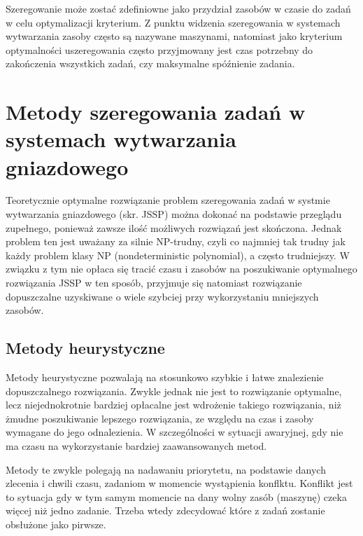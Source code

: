 \documentclass[twoside]{kInzynierka}
\begin{document}
Szeregowanie może zostać zdefiniowne jako przydział zasobów w czasie do zadań w celu optymalizacji kryterium. Z punktu widzenia szeregowania w systemach wytwarzania zasoby często są nazywane maszynami, natomiast jako kryterium optymalności uszeregowania często przyjmowany jest czas potrzebny do zakończenia wszystkich zadań, czy maksymalne spóźnienie zadania. \cite{antColony}  

\section        [Metody szeregowania zadań \ldots]
		        {Metody szeregowania zadań \newline w systemach wytwarzania gniazdowego}

Teoretycznie optymalne rozwiązanie problem szeregowania zadań w systmie wytwarzania gniazdowego (skr. JSSP) można dokonać na podstawie przeglądu zupełnego, ponieważ zawsze ilość możliwych rozwiązań jest skończona. Jednak problem ten jest uważany za silnie NP-trudny, czyli co najmniej tak trudny jak każdy problem klasy NP (nondeterministic polynomial), a często trudniejszy. W związku z tym nie opłaca się tracić czasu i zasobów na poszukiwanie optymalnego rozwiązania JSSP w ten sposób, przyjmuje się natomiast 
rozwiązanie dopuszczalne uzyskiwane o wiele szybciej przy wykorzystaniu mniejszych zasobów.

\subsection     {Metody heurystyczne}
Metody heurystyczne pozwalają na stosunkowo szybkie i łatwe znalezienie dopuszczalnego rozwiązania. Zwykle jednak nie jest to rozwiązanie optymalne, lecz niejednokrotnie bardziej opłacalne jest wdrożenie takiego rozwiązania, niż żmudne poszukiwanie lepszego rozwiązania, ze względu na czas i zasoby wymagane do jego odnalezienia. W szczególności w sytuacji awaryjnej, gdy nie ma czasu na wykorzystanie bardziej zaawansowanych metod. 

Metody te zwykle polegają na nadawaniu priorytetu, na podstawie danych zlecenia i chwili czasu, zadaniom w momencie wystąpienia konflktu. Konflikt jest to sytuacja gdy w tym samym momencie na dany wolny zasób (maszynę) czeka więcej niż jedno zadanie. Trzeba wtedy zdecydować które z zadań zostanie obsłużone jako pirwsze. 
\end{document}
